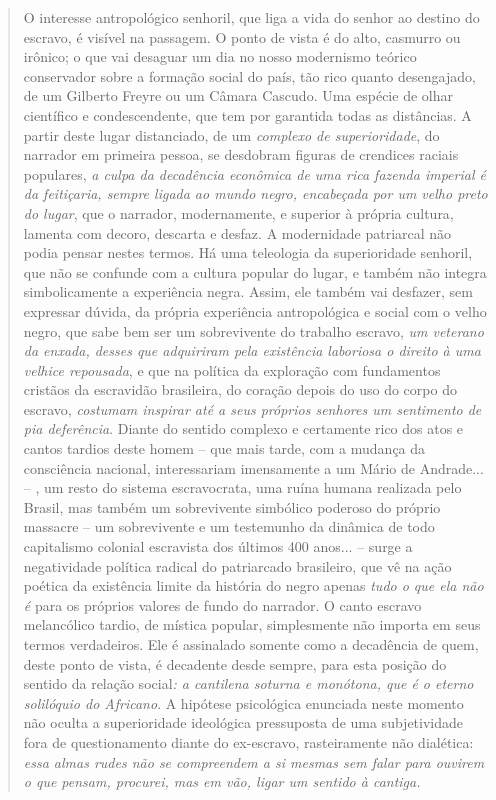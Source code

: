 \begin{quote}
O interesse antropológico senhoril, que liga a vida do senhor ao destino
do escravo, é visível na passagem. O ponto de vista é do alto, casmurro
ou irônico; o que vai desaguar um dia no nosso modernismo teórico
conservador sobre a formação social do país, tão rico quanto
desengajado, de um Gilberto Freyre ou um Câmara Cascudo. Uma espécie de
olhar científico e condescendente, que tem por garantida todas as
distâncias. A partir deste lugar distanciado, de um \emph{complexo de
superioridade}, do narrador em primeira pessoa, se desdobram figuras de
crendices raciais populares, \emph{a culpa da decadência econômica de
uma rica fazenda imperial é da feitiçaria, sempre ligada ao mundo negro,
encabeçada por um velho preto do lugar}, que o narrador, modernamente, e
superior à própria cultura, lamenta com decoro, descarta e desfaz. A
modernidade patriarcal não podia pensar nestes termos. Há uma teleologia
da superioridade senhoril, que não se confunde com a cultura popular do
lugar, e também não integra simbolicamente a experiência negra. Assim,
ele também vai desfazer, sem expressar dúvida, da própria experiência
antropológica e social com o velho negro, que sabe bem ser um
sobrevivente do trabalho escravo, \emph{um veterano da enxada, desses
que adquiriram pela existência laboriosa o direito à uma velhice
repousada}, e que na política da exploração com fundamentos cristãos da
escravidão brasileira, do coração depois do uso do corpo do escravo,
\emph{costumam inspirar até a seus próprios senhores um sentimento de
pia deferência}. Diante do sentido complexo e certamente rico dos atos e
cantos tardios deste homem -- que mais tarde, com a mudança da
consciência nacional, interessariam imensamente a um Mário de Andrade...
-- , um resto do sistema escravocrata, uma ruína humana realizada pelo
Brasil, mas também um sobrevivente simbólico poderoso do próprio
massacre -- um sobrevivente e um testemunho da dinâmica de todo
capitalismo colonial escravista dos últimos 400 anos... -- surge a
negatividade política radical do patriarcado brasileiro, que vê na ação
poética da existência limite da história do negro apenas \emph{tudo o
que ela não é} para os próprios valores de fundo do narrador. O canto
escravo melancólico tardio, de mística popular, simplesmente não importa
em seus termos verdadeiros. Ele é assinalado somente como a decadência
de quem, deste ponto de vista, é decadente desde sempre, para esta
posição do sentido da relação social\emph{: a cantilena soturna e
monótona, que é o eterno solilóquio do Africano}. A hipótese psicológica
enunciada neste momento não oculta a superioridade ideológica
pressuposta de uma subjetividade fora de questionamento diante do
ex-escravo, rasteiramente não dialética: \emph{essa almas rudes não se
compreendem a si mesmas sem falar para ouvirem o que pensam, procurei,
mas em vão, ligar um sentido à cantiga. }


\end{quote}
